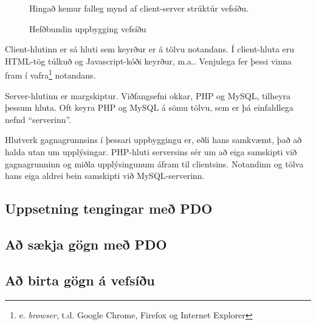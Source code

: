 \begin{figure}
\centering
\caption{Hefðbundin uppbygging vefsíðu}
\label{mynd:uppbyggingvefsidu}
\color{red} Hingað kemur falleg mynd af client-server strúktúr vefsíðu.
\end{figure}

Client-hlutinn er sá hluti sem keyrður er á tölvu notandans. Í client-hluta eru HTML-tög túlkuð og Javascript-kóði keyrður, m.a.. Venjulega fer þessi vinna fram í vafra\footnote{e. \emph{browser}, t.d. Google Chrome, Firefox og Internet Explorer} notandans.

Server-hlutinn er margskiptur. Viðfangsefni okkar, PHP og MySQL, tilheyra þessum hluta. Oft keyra PHP og MySQL á sömu tölvu, sem er þá einfaldlega nefnd ``serverinn''.

Hlutverk gagnagrunnsins í þessari uppbyggingu er, eðli hans samkvæmt, það að halda utan um upplýsingar. PHP-hluti serversins sér um að eiga samskipti við gagnagrunninn og miðla upplýsingunum áfram til clientsins. Notandinn og tölva hans eiga aldrei bein samskipti við MySQL-serverinn.

\subsection{Uppsetning tengingar með PDO}
\subsection{Að sækja gögn með PDO}
\subsection{Að birta gögn á vefsíðu}